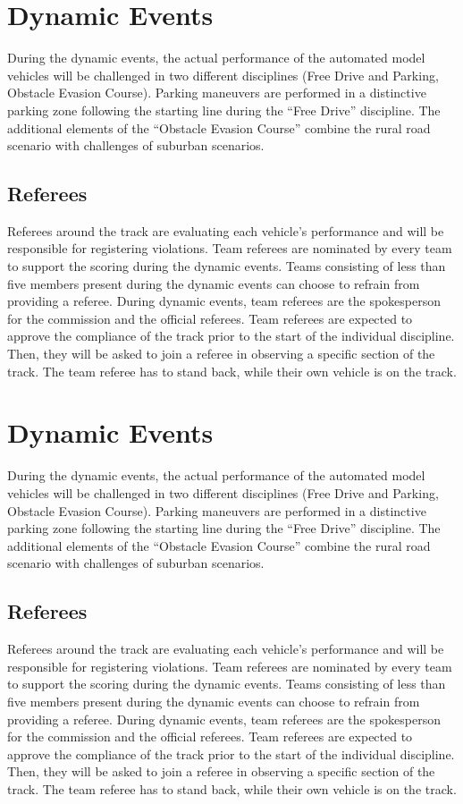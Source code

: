 \chapter{Dynamic Events}

During the dynamic events, the actual performance of the automated model
vehicles will be challenged in two different disciplines (Free Drive and
Parking, Obstacle Evasion Course). Parking maneuvers are performed in a
distinctive parking zone following the starting line during the “Free Drive”
discipline. The additional elements of the “Obstacle Evasion Course” combine
the rural road scenario with challenges of suburban scenarios.

\section{Referees}

Referees around the track are evaluating each vehicle’s performance and will be
responsible for registering violations. Team referees are nominated by every
team to support the scoring during the dynamic events. Teams consisting of less
than five members present during the dynamic events can choose to refrain from
providing a referee. During dynamic events, team referees are the spokesperson
for the commission and the official referees. Team referees are expected to
approve the compliance of the track prior to the start of the individual
discipline. Then, they will be asked to join a referee in observing a specific
section of the track. The team referee has to stand back, while their own
vehicle is on the track.\chapter{Dynamic Events}

During the dynamic events, the actual performance of the automated model
vehicles will be challenged in two different disciplines (Free Drive and
Parking, Obstacle Evasion Course). Parking maneuvers are performed in a
distinctive parking zone following the starting line during the “Free Drive”
discipline. The additional elements of the “Obstacle Evasion Course” combine
the rural road scenario with challenges of suburban scenarios.

\section{Referees}

Referees around the track are evaluating each vehicle’s performance and will be
responsible for registering violations. Team referees are nominated by every
team to support the scoring during the dynamic events. Teams consisting of less
than five members present during the dynamic events can choose to refrain from
providing a referee. During dynamic events, team referees are the spokesperson
for the commission and the official referees. Team referees are expected to
approve the compliance of the track prior to the start of the individual
discipline. Then, they will be asked to join a referee in observing a specific
section of the track. The team referee has to stand back, while their own
vehicle is on the track.


